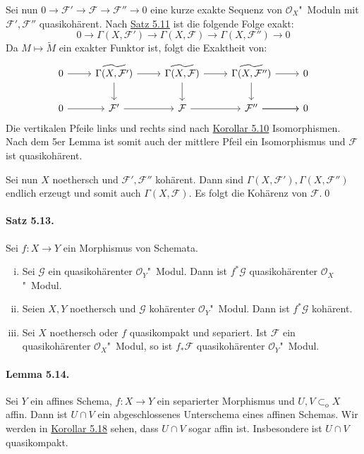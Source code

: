 Sei nun $0\to\mathcal{F}'\to\mathcal{F}\to\mathcal{F}''\to 0$ eine kurze exakte Sequenz von $\mathcal{O}_X$"~Moduln mit $\mathcal{F}',\mathcal{F}''$ quasikohärent. Nach \hyperref[5.11]{Satz 5.11} ist die folgende Folge exakt:
\[0\to\Gamma(X,\mathcal{F}')\to\Gamma(X,\mathcal{F})\to\Gamma(X,\mathcal{F}'')\to 0 \]
Da $M\mapsto\widetilde{M}$ ein exakter Funktor ist, folgt die Exaktheit von:
\[\begin{tikzcd}
0  \ar[r]& \widetilde{\Gamma(X,\mathcal{F}')} \ar[d] \ar[r]& \widetilde{\Gamma(X,\mathcal{F})} \ar[d] \ar[r]& \widetilde{\Gamma(X,\mathcal{F}'')} \ar[d] \ar[r]& 0\\
0 \ar[r] & \mathcal{F}'  \ar[r]& \mathcal{F}  \ar[r]&  \ar[r]\mathcal{F}''  \ar[r]& 0
\end{tikzcd} \]
Die vertikalen Pfeile links und rechts sind nach \hyperref[5.10]{Korollar 5.10} Isomorphismen. Nach dem 5er Lemma ist somit auch der mittlere Pfeil ein Isomorphismus und $\mathcal{F}$ ist quasikohärent.

Sei nun $X$ noethersch und $\mathcal{F}',\mathcal{F}''$ kohärent. Dann sind $\Gamma(X,\mathcal{F}'),\Gamma(X,\mathcal{F}'')$ endlich erzeugt und somit auch $\Gamma(X,\mathcal{F})$. Es folgt die Kohärenz von $\mathcal{F}$.\qed

\paragraph{Satz 5.13.}\label{5.13} Sei $f:X\to Y$ ein Morphismus von Schemata.
\begin{enumerate}[(i)]
\item Sei $\mathcal{G}$ ein quasikohärenter $\mathcal{O}_Y$"~Modul. Dann ist $f^\ast\mathcal{G}$ quasikohärenter $\mathcal{O}_X$"~Modul.
\item Seien $X,Y$ noethersch und $\mathcal{G}$ kohärenter $\mathcal{O}_Y$"~Modul. Dann ist $f^\ast\mathcal{G}$ kohärent.
\item Sei $X$ noethersch oder $f$ quasikompakt und separiert. Ist $\mathcal{F}$ ein quasikohärenter $\mathcal{O}_X$"~Modul, so ist $f_\ast\mathcal{F}$ quasikohärenter $\mathcal{O}_Y$"~Modul.
\end{enumerate}

\paragraph{Lemma 5.14.}\label{5.14} Sei $Y$ ein affines Schema, $f:X\to Y$ ein separierter Morphismus und $U,V\subset_\text{o}X$ affin. Dann ist $U\cap V$ ein abgeschlossenes Unterschema eines affinen Schemas. Wir werden in \hyperref[5.18]{Korollar 5.18} sehen, dass $U\cap V$ sogar affin ist. Insbesondere ist $U\cap V$ quasikompakt.


